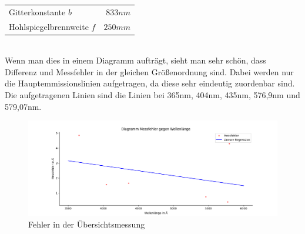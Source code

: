 \newline
\begin{tabular}[h]{l r}
    Gitterkonstante $b$ & $833 nm$\\
    Hohlspiegelbrennweite $f$ & $250mm$\\
\end{tabular}
\\
\newline
Wenn man dies in einem Diagramm aufträgt, sieht man sehr schön, dass Differenz und Messfehler in der gleichen Größenordnung sind. Dabei werden nur die Hauptemmissionslinien 
aufgetragen, da diese sehr eindeutig zuordenbar sind. Die aufgetragenen Linien sind die Linien bei 365nm, 404nm, 435nm, 576,9nm und 579,07nm.
\begin{figure}[h]
    \centering
    \includegraphics[width =\linewidth]{Bilder/linregress.png}
    \caption{Fehler in der Übersichtsmessung}
    \label{FehlUeb}
\end{figure}
